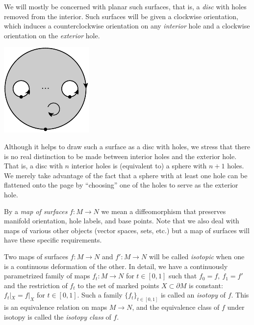 \documentclass[aps, prl, letterpaper, twocolumn, superscriptaddress, notitlepage, 10pt]{revtex4-1}
\begin{document}
We will mostly be concerned with planar such
surfaces, that is, a \emph{disc} with holes removed from the
interior.
Such surfaces will be given a clockwise 
orientation, which induces a counterclockwise orientation on
any \emph{interior} hole and a clockwise orientation
on the \emph{exterior} hole.
\begin{center}
\includegraphics[]{pic-disc.pdf}
\end{center}
Although it helps to draw such a surface as a disc with holes,
we stress that there is no real distinction to be made between
interior holes and the exterior hole.
That is, 
a disc with $n$ interior holes is (equivalent to) a sphere with $n+1$ holes.
We merely take advantage of the fact that a sphere with at least one hole
can be flattened onto the page by ``choosing'' one of the holes to
serve as the exterior hole.

By a \emph{map of surfaces} $f:M\to N$ we mean 
a diffeomorphism that preserves
manifold orientation, hole labels, and base points.
Note that we also deal with maps of various other objects
(vector spaces, sets, etc.)
but a map of surfaces will have these specific
requirements.

Two maps of surfaces $f:M\to N$ and $f':M\to N$
will be called \emph{isotopic}
when one is a continuous deformation of the other.
In detail,
we have a continuously
parametrized family of maps $f_t:M\to N$ for $t\in [0, 1]$
such that $f_0=f,\ f_1=f'$
and the restriction of $f_t$ to the 
set of marked points $X\subset\partial M$ is constant:
$f_t|_{X} = f|_{X}$ for $t\in [0, 1].$
Such a family $\{f_t\}_{t\in [0,1]}$ is called an \emph{isotopy}
of $f.$
This is an equivalence relation on maps $M\to N$, and the equivalence
class of $f$ under isotopy is called the \emph{isotopy class} of $f.$
\end{document}
